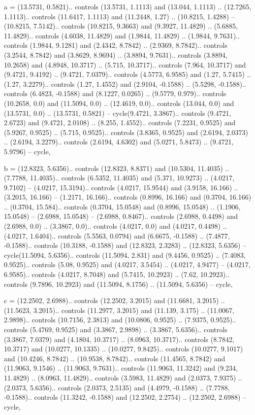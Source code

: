a = {(13.5731, 0.5821).. controls (13.5731, 1.1113) and (13.044, 1.1113) .. (12.7265, 1.1113).. controls (11.6417, 1.1113) and (11.2448, 1.27) .. (10.8215, 1.4288) -- (10.8215, 7.5142).. controls (10.8215, 9.3663) and (9.3927, 11.4829) .. (5.6885, 11.4829).. controls (4.6038, 11.4829) and (1.9844, 11.4829) .. (1.9844, 9.7631).. controls (1.9844, 9.1281) and (2.4342, 8.7842) .. (2.9369, 8.7842).. controls (3.2544, 8.7842) and (3.8629, 8.9694) .. (3.8894, 9.7631).. controls (3.8894, 10.2658) and (4.8948, 10.3717) .. (5.715, 10.3717).. controls (7.964, 10.3717) and (9.4721, 9.4192) .. (9.4721, 7.0379).. controls (4.5773, 6.9585) and (1.27, 5.7415) .. (1.27, 3.2279).. controls (1.27, 1.4552) and (2.9104, -0.1588) .. (5.5298, -0.1588).. controls (6.4823, -0.1588) and (8.1227, 0.0265) .. (9.5779, 0.979).. controls (10.2658, 0.0) and (11.5094, 0.0) .. (12.4619, 0.0).. controls (13.044, 0.0) and (13.5731, 0.0) .. (13.5731, 0.5821) -- cycle(9.4721, 3.3867).. controls (9.4721, 2.6723) and (9.4721, 2.0108) .. (8.255, 1.4552).. controls (7.2231, 0.9525) and (5.9267, 0.9525) .. (5.715, 0.9525).. controls (3.8365, 0.9525) and (2.6194, 2.0373) .. (2.6194, 3.2279).. controls (2.6194, 4.6302) and (5.0271, 5.8473) .. (9.4721, 5.9796) -- cycle},

b = {(12.8323, 5.6356).. controls (12.8323, 8.8371) and (10.5304, 11.4035) .. (7.7788, 11.4035).. controls (6.5352, 11.4035) and (5.371, 10.9273) .. (4.0217, 9.7102) -- (4.0217, 15.3194).. controls (4.0217, 15.9544) and (3.9158, 16.166) .. (3.2015, 16.166) -- (1.2171, 16.166).. controls (0.8996, 16.166) and (0.3704, 16.166) .. (0.3704, 15.584).. controls (0.3704, 15.0548) and (0.8996, 15.0548) .. (1.1906, 15.0548) -- (2.6988, 15.0548) -- (2.6988, 0.8467).. controls (2.6988, 0.4498) and (2.6988, 0.0) .. (3.3867, 0.0).. controls (4.0217, 0.0) and (4.0217, 0.4498) .. (4.0217, 1.6404).. controls (5.5563, 0.0794) and (6.6675, -0.1588) .. (7.4877, -0.1588).. controls (10.3188, -0.1588) and (12.8323, 2.3283) .. (12.8323, 5.6356) -- cycle(11.5094, 5.6356).. controls (11.5094, 2.831) and (9.4456, 0.9525) .. (7.4083, 0.9525).. controls (5.08, 0.9525) and (4.0217, 3.5454) .. (4.0217, 4.9477) -- (4.0217, 6.9585).. controls (4.0217, 8.7048) and (5.7415, 10.2923) .. (7.62, 10.2923).. controls (9.7896, 10.2923) and (11.5094, 8.1756) .. (11.5094, 5.6356) -- cycle},

c = {(12.2502, 2.6988).. controls (12.2502, 3.2015) and (11.6681, 3.2015) .. (11.5623, 3.2015).. controls (11.2977, 3.2015) and (11.139, 3.175) .. (11.0067, 2.9898).. controls (10.7156, 2.3813) and (10.0806, 0.9525) .. (7.9375, 0.9525).. controls (5.4769, 0.9525) and (3.3867, 2.9898) .. (3.3867, 5.6356).. controls (3.3867, 7.0379) and (4.1804, 10.3717) .. (8.0963, 10.3717).. controls (8.7842, 10.3717) and (10.0277, 10.1335) .. (10.0277, 9.8425).. controls (10.0277, 9.1017) and (10.4246, 8.7842) .. (10.9538, 8.7842).. controls (11.4565, 8.7842) and (11.9063, 9.1546) .. (11.9063, 9.7631).. controls (11.9063, 11.3242) and (9.234, 11.4829) .. (8.0963, 11.4829).. controls (3.5983, 11.4829) and (2.0373, 7.9375) .. (2.0373, 5.6356).. controls (2.0373, 2.5135) and (4.4979, -0.1588) .. (7.7788, -0.1588).. controls (11.3242, -0.1588) and (12.2502, 2.2754) .. (12.2502, 2.6988) -- cycle},

